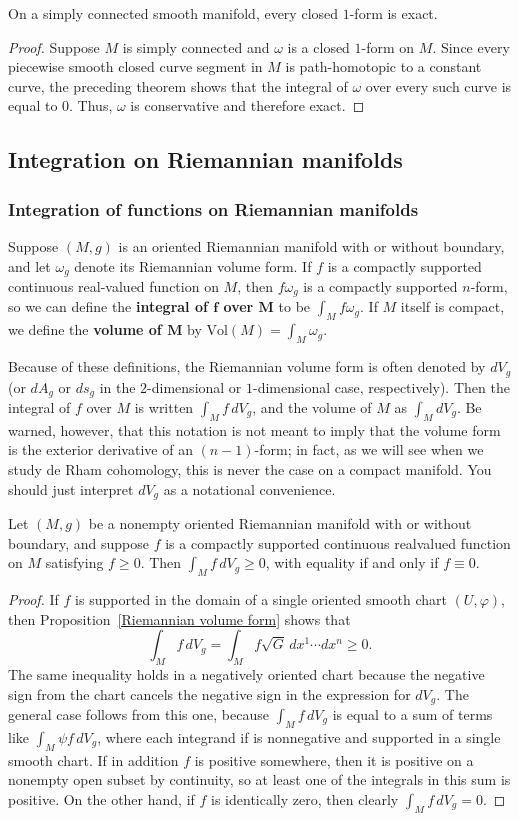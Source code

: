 \begin{corollary}\label{simply con 1 form}
On a simply connected smooth manifold, every closed $1$-form is exact.
\end{corollary}
\begin{proof}
Suppose $M$ is simply connected and $\omega$ is a closed $1$-form on $M$. Since every piecewise smooth closed curve segment in $M$ is path-homotopic to a constant curve,
the preceding theorem shows that the integral of $\omega$ over every such curve is equal to $0$. Thus, $\omega$ is conservative and therefore exact.
\end{proof}
\subsection{Integration on Riemannian manifolds}
\subsubsection{Integration of functions on Riemannian manifolds}
Suppose $(M,g)$ is an oriented Riemannian manifold with or without boundary, and let $\omega_g$ denote its Riemannian volume form. If $f$ is a compactly supported continuous real-valued function on $M$, then $f\omega_g$ is a compactly supported $n$-form, so we can define the \textbf{integral of $\bm{f}$ over $\bm{M}$} to be $\int_Mf\omega_g$. If $M$ itself is compact, we define the \textbf{volume of $\bm{M}$} by $\mathrm{Vol}(M)=\int_M\omega_g$.\par
Because of these definitions, the Riemannian volume form is often denoted by $dV_g$ (or $dA_g$ or $ds_g$ in the $2$-dimensional or $1$-dimensional case, respectively). Then the integral of $f$ over $M$ is written $\int_M f\,dV_g$, and the volume of $M$ as $\int_MdV_g$. Be warned, however, that this notation is not meant to imply that the volume form is the exterior derivative of an $(n-1)$-form; in fact, as we will see when we study de Rham cohomology, this is never the case on a compact manifold. You should just interpret $dV_g$ as a notational convenience.
\begin{proposition}
Let $(M,g)$ be a nonempty oriented Riemannian manifold with or without boundary, and suppose $f$ is a compactly supported continuous realvalued function on $M$ satisfying $f\geq0$. Then $\int_Mf\,dV_g\geq0$, with equality if and only if $f\equiv 0$.
\end{proposition}
\begin{proof}
If $f$ is supported in the domain of a single oriented smooth chart $(U,\varphi)$, then Proposition~\ref{Riemannian volume form} shows that
\[\int_Mf\,dV_g=\int_Mf\sqrt{G}\,dx^1\cdots dx^n\geq0.\]
The same inequality holds in a negatively oriented chart because the negative sign from the chart cancels the negative sign in the expression for $dV_g$. The general case follows from this one, because $\int_Mf\,dV_g$ is equal to a sum of terms like
$\int_M\psi f\,dV_g$, where each integrand if is nonnegative and supported in a single
smooth chart. If in addition $f$ is positive somewhere, then it is positive on a nonempty open subset by continuity, so at least one of the integrals in this sum is
positive. On the other hand, if $f$ is identically zero, then clearly $\int_Mf\,dV_g=0$.
\end{proof}
